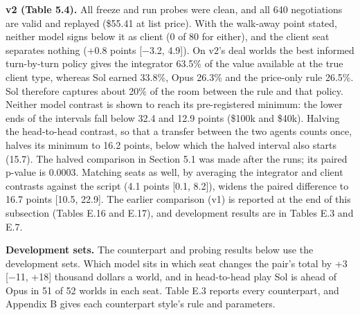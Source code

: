 \textbf{v2 (Table 5.4).} All freeze and run probes were clean, and all 640 negotiations are valid and replayed (\$55.41 at
list price). With the walk-away point stated, neither model signs below it as client (0 of 80 for either), and the
client seat separates nothing (+0.8 points {[}−3.2, 4.9{]}). On v2's deal worlds the best informed turn-by-turn policy
gives the integrator 63.5\% of the value available at the true client type, whereas Sol earned 33.8\%, Opus 26.3\% and
the price-only rule 26.5\%. Sol therefore captures about 20\% of the room between the rule and that policy. Neither
model contrast is shown to reach its pre-registered minimum: the lower ends of the intervals fall below 32.4 and 12.9
points (\$100k and \$40k). Halving the head-to-head contrast, so that a transfer between the two agents counts once,
halves its minimum to 16.2 points, below which the halved interval also starts (15.7). The halved comparison in
Section 5.1 was made after the runs; its paired p-value is 0.0003. Matching seats as well, by averaging the
integrator and client contrasts against the script (4.1 points {[}0.1, 8.2{]}), widens the paired difference to 16.7
points {[}10.5, 22.9{]}. The earlier
comparison (v1) is reported at the end of this subsection (Tables E.16 and E.17), and development results are in
Tables E.3 and E.7.

\textbf{Development sets.} The counterpart and probing results below use the development sets. Which model sits in which seat changes the
pair's total by +3 {[}−11, +18{]} thousand dollars a world, and in head-to-head play Sol is ahead of Opus in 51 of 52
worlds in each seat. Table E.3 reports every counterpart, and Appendix B gives each counterpart style's rule and
parameters.

